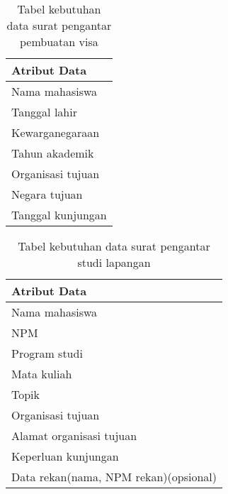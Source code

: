 \begin{table}[h]
\centering
\caption{Tabel kebutuhan data surat pengantar pembuatan visa}
\label{surat_pengantar_pembuatan_visa}
\begin{tabular}{|l|}
\hline
\textbf{Atribut Data}                     \\ \hline
Nama mahasiswa                            \\ \hline 
Tanggal lahir                    			\\ \hline 
Kewarganegaraan                     	    \\ \hline 
Tahun akademik              				\\ \hline 
Organisasi tujuan         			    \\ \hline 
Negara tujuan              			    \\ \hline 
Tanggal kunjungan                         \\ \hline 
\end{tabular}
\end{table}

\begin{table}[h]
\centering
\caption{Tabel kebutuhan data surat pengantar studi lapangan}
\label{surat_kebutuhan data_surat_pengantar_studi_lapangan}
\begin{tabular}{|l|}
\hline
\textbf{Atribut Data}                     \\ \hline
Nama mahasiswa                            \\ \hline 
NPM                                      \\ \hline 
Program studi                             \\ \hline
Mata kuliah			                    \\ \hline
Topik        			                    \\ \hline
Organisasi tujuan                         \\ \hline
Alamat organisasi tujuan                  \\ \hline
Keperluan kunjungan                       \\ \hline
Data rekan(nama, NPM rekan)(opsional)     \\ \hline

\end{tabular}
\end{table}


